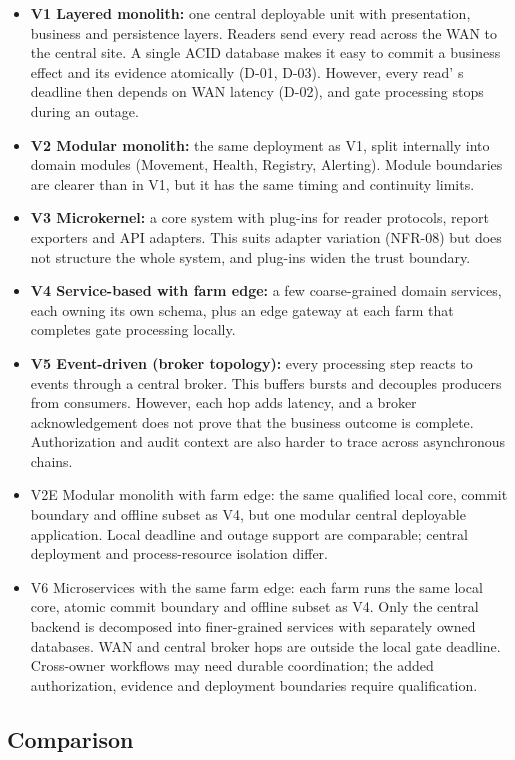 \begin{itemize}
  \item \textbf{V1 Layered monolith:} one central deployable unit with presentation, business and persistence layers. Readers send every read across the WAN to the central site. A single ACID database makes it easy to commit a business effect and its evidence atomically (D-01, D-03). However, every read' s deadline then depends on WAN latency (D-02), and gate processing stops during an outage.
  \item \textbf{V2 Modular monolith:} the same deployment as V1, split internally into domain modules (Movement, Health, Registry, Alerting). Module boundaries are clearer than in V1, but it has the same timing and continuity limits.
  \item \textbf{V3 Microkernel:} a core system with plug-ins for reader protocols, report exporters and API adapters. This suits adapter variation (NFR-08) but does not structure the whole system, and plug-ins widen the trust boundary.
  \item \textbf{V4 Service-based with farm edge:} a few coarse-grained domain services, each owning its own schema, plus an edge gateway at each farm that completes gate processing locally.
  \item \textbf{V5 Event-driven (broker topology):} every processing step reacts to events through a central broker. This buffers bursts and decouples producers from consumers. However, each hop adds latency, and a broker acknowledgement does not prove that the business outcome is complete. Authorization and audit context are also harder to trace across asynchronous chains.
  \item V2E Modular monolith with farm edge: the same qualified local core, commit boundary and offline subset as V4, but one modular central deployable application. Local deadline and outage support are comparable; central deployment and process-resource isolation differ.
  \item V6 Microservices with the same farm edge: each farm runs the same local core, atomic commit boundary and offline subset as V4. Only the central backend is decomposed into finer-grained services with separately owned databases. WAN and central broker hops are outside the local gate deadline. Cross-owner workflows may need durable coordination; the added authorization, evidence and deployment boundaries require qualification.
\end{itemize}


\subsection{Comparison}\label{sec:4.2}

